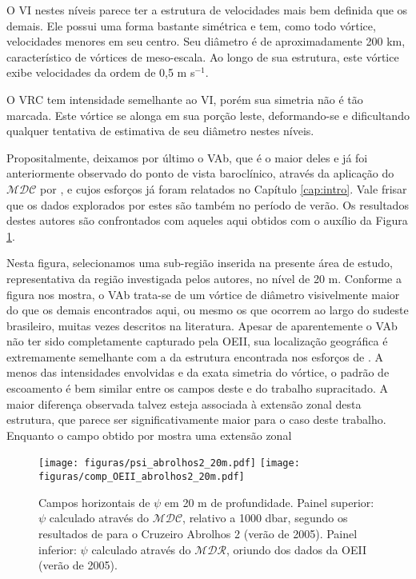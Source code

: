 O VI nestes níveis parece ter a estrutura de
velocidades mais bem definida que os demais. Ele possui uma forma bastante simétrica e tem, como todo vórtice, 
velocidades menores em seu centro. Seu diâmetro é de aproximadamente 200 km, característico de vórtices
de meso-escala. Ao longo de sua estrutura, este vórtice exibe velocidades da ordem de 0,5 m s$^{-1}$.

O VRC tem intensidade semelhante ao VI, porém sua simetria não é tão marcada.
Este vórtice se alonga em sua porção leste, deformando-se e dificultando qualquer
tentativa de estimativa de seu diâmetro nestes níveis. 

Propositalmente, deixamos por último o VAb,
que é o maior deles e já foi 
anteriormente observado do ponto de vista baroclínico, através da aplicação do $\mathcal{MDC}$ 
por \cite{silveira_etal2006B}, e cujos esforços já foram relatados no Capítulo \ref{cap:intro}.
Vale frisar que os dados explorados por estes são também no período de verão. 
 Os resultados destes autores são confrontados com aqueles aqui 
obtidos com o auxílio da Figura \ref{fig:VAb}. 

Nesta figura, selecionamos 
uma sub-região inserida na presente área de estudo, representativa da região investigada pelos autores, 
no nível de 20 m.
Conforme a figura nos mostra, o VAb trata-se 
de um vórtice de diâmetro visivelmente maior do que os demais encontrados aqui, ou mesmo os que ocorrem
ao largo do sudeste brasileiro, muitas vezes descritos na literatura. Apesar de aparentemente
o VAb não ter sido completamente capturado pela OEII, sua localização geográfica é 
extremamente semelhante com a da estrutura encontrada nos esforços de \cite{silveira_etal2006B}.
A menos das intensidades envolvidas e da exata simetria do vórtice, o padrão de escoamento é bem similar
 entre os campos deste e do trabalho supracitado. A maior diferença observada talvez esteja associada à extensão 
zonal desta estrutura, que parece ser significativamente maior para o caso deste trabalho. 
Enquanto o campo obtido por \cite{silveira_etal2006B} mostra uma extensão zonal 

\begin{figure}%
 \begin{center}
  \texttt{[image: figuras/psi\_abrolhos2\_20m.pdf]}
  \texttt{[image: figuras/comp\_OEII\_abrolhos2\_20m.pdf]}
 \end{center}
 \vspace{-.25cm}
 \renewcommand{\baselinestretch}{1}
 \caption{\label{fig:VAb} \small Campos horizontais de $\psi$ em 20 m de profundidade.
Painel superior: $\psi$ calculado através do $\mathcal{MDC}$, relativo a 1000 dbar, 
segundo os resultados de \cite{silveira_etal2006B} para o Cruzeiro Abrolhos 2 (verão de 2005).
Painel inferior: $\psi$ calculado através do $\mathcal{MDR}$, oriundo dos dados da OEII (verão de 2005).}
\end{figure}

